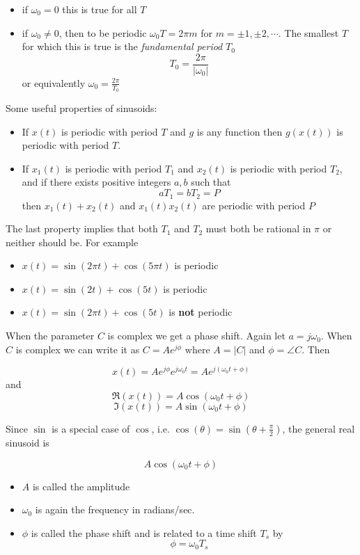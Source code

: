 \begin{itemize}
\item if $\omega_0 = 0$ this is true for all $T$
\item if $\omega_0 \neq 0$, then to be periodic $\omega_0 T = 2\pi m$ for $m = \pm 1, \pm 2, \cdots$. The smallest $T$ for which this is true is the {\it fundamental period} $T_0$
  \[
  T_0 = \frac{2\pi}{|\omega_0|}
  \]
  or equivalently $\omega_0 = \frac{2\pi}{T_0}$
\end{itemize}

Some useful properties of sinusoids:

\begin{itemize}
\item If $x(t)$ is periodic with period $T$ and $g$ is any function then $g(x(t))$ is periodic with period $T$.
\item If $x_1(t)$ is periodic with period $T_1$ and $x_2(t)$ is periodic with period $T_2$, and if there exists positive integers $a,b$ such that
  \[
  aT_1 = b T_2 = P
  \]
  then $x_1(t) + x_2(t)$ and $x_1(t)x_2(t)$ are periodic with period $P$
\end{itemize}
The last property implies that both $T_1$ and $T_2$ must both be rational in $\pi$ or neither should be. For example

\begin{itemize}
\item $x(t) = \sin(2\pi t) + \cos(5\pi t)$ is periodic
\item $x(t) = \sin(2 t) + \cos(5 t)$ is periodic
\item $x(t) = \sin(2\pi t) + \cos(5 t)$ is {\bf not} periodic
\end{itemize}

When the parameter $C$ is complex we get a phase shift. Again let $a = j\omega_0$. When $C$ is complex we can write it as $C = Ae^{j\phi}$ where $A = |C|$ and $\phi = \angle C$. Then

\[
x(t) = Ae^{j\phi} e^{j\omega_0 t} = Ae^{j(\omega_0 t+\phi)} 
\]
and
\[
\Re(x(t)) = A\cos(\omega_0 t+\phi) 
\]
\[
\Im(x(t)) = A\sin(\omega_0 t+\phi) 
\]

Since $\sin$ is a special case of $\cos$, i.e. $\cos(\theta) = \sin(\theta + \frac{\pi}{2})$, the general real sinusoid is

\[
A\cos(\omega_0 t + \phi)
\]
  
\begin{itemize}
\item $A$ is called the amplitude
\item $\omega_0$ is again the frequency in radians/sec.
\item $\phi$ is called the phase shift and is related to a time shift $T_s$ by
  \[
  \phi = \omega_0T_s
  \]
\end{itemize}

